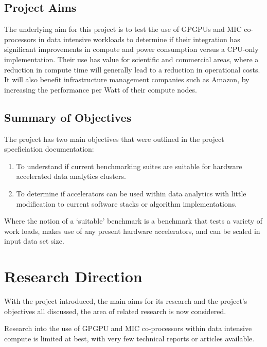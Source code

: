\documentclass[12pt,a4paper]{article}
\begin{document}
	    \subsection{Project Aims}
	    \label{sub:project_aims}
	    
	        The underlying aim for this project is to test the use of GPGPUs and MIC co-processors in data intensive workloads to determine if their integration has significant improvements in compute and power consumption versus a CPU-only implementation. Their use has value for scientific and commercial areas, where a reduction in compute time will generally lead to a reduction in operational costs. It will also benefit infrastructure management companies such as Amazon, by increasing the performance per Watt of their compute nodes.
	        
	    \subsection{Summary of Objectives}
	    \label{sub:summary_of_objectives}
	    
	        The project has two main objectives that were outlined in the project specficiation documentation:
	        
	        \begin{enumerate}
	        \item To understand if current benchmarking suites are suitable for hardware accelerated data analytics clusters.
	        \item To determine if accelerators can be used within data analytics with little modification to current software stacks or algorithm implementations.
	        \end{enumerate}
	        
	        Where the notion of a `suitable' benchmark is a benchmark that tests a variety of work loads, makes use of any present hardware accelerators, and can be scaled in input data set size.
	    
    \section{Research Direction}
    \label{sec:research_direction}
    
        With the project introduced, the main aims for its research and the project's objectives all discussed, the area of related research is now considered.
    
        Research into the use of GPGPU and MIC co-processors within data intensive compute is limited at best, with very few technical reports or articles available.
        
\end{document}

